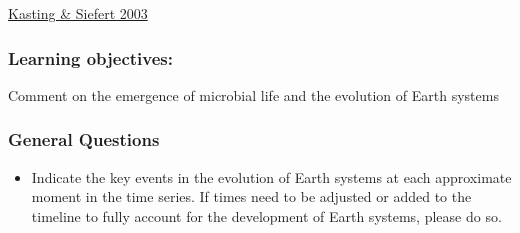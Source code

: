 \documentclass[]{article}
\begin{document}
\href{http://science.sciencemag.org/content/296/5570/1066/tab-article-info}{Kasting
\& Siefert 2003}

\subsubsection{Learning objectives:}\label{learning-objectives-1}

Comment on the emergence of microbial life and the evolution of Earth
systems

\subsubsection{General Questions}\label{general-questions-1}

\begin{itemize}
\item
  Indicate the key events in the evolution of Earth systems at each
  approximate moment in the time series. If times need to be adjusted or
  added to the timeline to fully account for the development of Earth
  systems, please do so.


\end{itemize}
\end{document}
